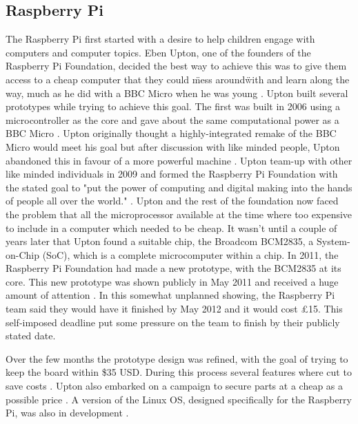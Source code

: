 \subsection{Raspberry Pi}
The Raspberry Pi first started with a desire to help children engage with computers and computer topics. Eben Upton, one of the founders of the Raspberry Pi Foundation, decided the best way to achieve this was to give them access to a cheap computer that they could \"mess around\" with and learn along the way, much as he did with a BBC Micro when he was young 
\cite{RN98}. Upton built several prototypes while trying to achieve this goal. The first was built in 2006 using a microcontroller as the core and gave about the same computational power as a BBC Micro 
\cite{RN137}. Upton originally thought a highly-integrated remake of the BBC Micro would meet his goal but after discussion with like minded people, Upton abandoned this in favour of a more powerful machine 
\cite{RN98}. Upton team-up with other like minded individuals in 2009 and formed the Raspberry Pi Foundation with the stated goal to "put the power of computing and digital making into the hands of people all over the world." 
\cite{RN138}. Upton and the rest of the foundation now faced the problem that all the microprocessor available at the time where too expensive to include in a computer which needed to be cheap. It wasn't until a couple of years later that Upton found a suitable chip, the Broadcom BCM2835, a System-on-Chip (SoC), which is a complete microcomputer within a chip. In 2011, the Raspberry Pi Foundation had made a new prototype, with the BCM2835 at its core. This new prototype was shown publicly in May 2011 and received a huge amount of attention 
\cite{RN140}. In this somewhat unplanned showing, the Raspberry Pi team said they would have it finished by May 2012 and it would cost \pounds 15. This self-imposed deadline put some pressure on the team to finish by their publicly stated date.  

Over the few months the prototype design was refined, with the goal of trying to keep the board within \$35 USD. During this process several features where cut to save costs 
\cite{RN98}. Upton also embarked on a campaign to secure parts at a cheap as a possible price 
\cite{RN98}. A version of the Linux OS, designed specifically for the Raspberry Pi, was also in development \cite{RN98}.

